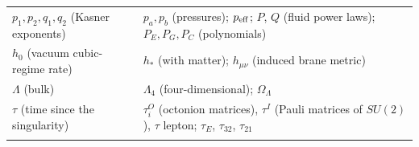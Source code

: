 \documentclass[10pt,a4paper]{article}
\begin{document}
{\begin{longtable}{>{\raggedright\arraybackslash}p{}>{\raggedright\arraybackslash}p{}}
$p_1,p_2,q_1,q_2$ (Kasner exponents) & $p_a,p_b$ (pressures); $p_{\rm eff}$; $P$, $Q$ (fluid power laws); $P_E,P_G,P_C$ (polynomials) \\
$h_0$ (vacuum cubic-regime rate) & $h_*$ (with matter); $h_{\mu\nu}$ (induced brane metric) \\
$\Lambda$ (bulk) & $\Lambda_4$ (four-dimensional); $\Omega_\Lambda$ \\
$\tau$ (time since the singularity) & $\tau^O_i$ (octonion matrices), $\tau^I$ (Pauli matrices of $SU(2)$), $\tau$ lepton; $\tau_E$, $\tau_{32}$, $\tau_{21}$ \\*
\end{longtable}}
\end{document}

